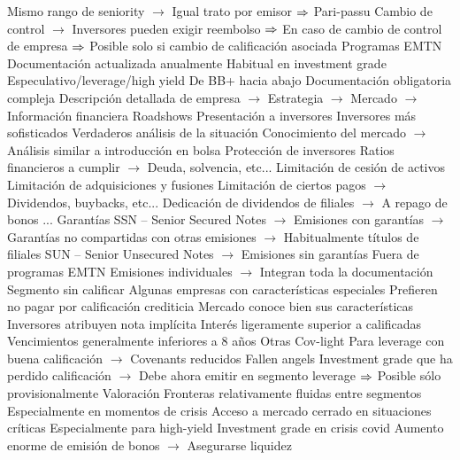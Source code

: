 \documentclass{nuevotema}
\begin{document}
\begin{esquemal}
				\4[] Mismo rango de seniority
				\4[] $\to$ Igual trato por emisor
				\4[] $\Rightarrow$ Pari-passu
				\4[] Cambio de control
				\4[] $\to$ Inversores pueden exigir reembolso
				\4[] $\Rightarrow$ En caso de cambio de control de empresa
				\4[] $\Rightarrow$ Posible solo si cambio de calificación asociada
				\4 Programas EMTN
				\4[] Documentación actualizada anualmente
				\4[] Habitual en investment grade
			\3 Especulativo/leverage/high yield
				\4 De BB+ hacia abajo
				\4 Documentación obligatoria compleja
				\4[] Descripción detallada de empresa
				\4[] $\to$ Estrategia
				\4[] $\to$ Mercado
				\4[] $\to$ Información financiera
				\4 Roadshows
				\4[] Presentación a inversores
				\4 Inversores más sofisticados
				\4[] Verdaderos análisis de la situación
				\4[] Conocimiento del mercado
				\4[] $\to$ Análisis similar a introducción en bolsa
				\4 Protección de inversores
				\4[] Ratios financieros a cumplir
				\4[] $\to$ Deuda, solvencia, etc...
				\4[] Limitación de cesión de activos
				\4[] Limitación de adquisiciones y fusiones
				\4[] Limitación de ciertos pagos
				\4[] $\to$ Dividendos, buybacks, etc...
				\4[] Dedicación de dividendos de filiales
				\4[] $\to$ A repago de bonos
				\4[] ...
				\4 Garantías
				\4[] SSN -- Senior Secured Notes
				\4[] $\to$ Emisiones con garantías
				\4[] $\to$ Garantías no compartidas con otras emisiones
				\4[] $\to$ Habitualmente títulos de filiales
				\4[] SUN -- Senior Unsecured Notes
				\4[] $\to$ Emisiones sin garantías
				\4 Fuera de programas EMTN
				\4[] Emisiones individuales
				\4[] $\to$ Integran toda la documentación
			\3 Segmento sin calificar
				\4 Algunas empresas con características especiales
				\4[] Prefieren no pagar por calificación crediticia
				\4[] Mercado conoce bien sus características
				\4 Inversores atribuyen nota implícita
				\4 Interés ligeramente superior a calificadas
				\4 Vencimientos generalmente inferiores a 8 años
			\3 Otras
				\4 Cov-light
				\4[] Para leverage con buena calificación
				\4[] $\to$ Covenants reducidos
				\4 Fallen angels
				\4[] Investment grade que ha perdido calificación
				\4[] $\to$ Debe ahora emitir en segmento leverage
				\4[] $\Rightarrow$ Posible sólo provisionalmente
			\3 Valoración
				\4 Fronteras relativamente fluidas entre segmentos
				\4[] Especialmente en momentos de crisis
				\4 Acceso a mercado cerrado en situaciones críticas
				\4[] Especialmente para high-yield
				\4 Investment grade en crisis covid
				\4[] Aumento enorme de emisión de bonos
				\4[] $\to$ Asegurarse liquidez
	\1 

\end{esquemal}
\end{document}
